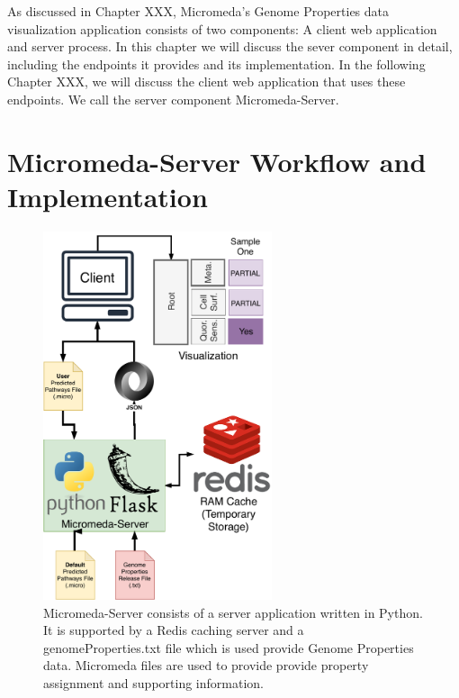 As discussed in Chapter XXX, Micromeda's Genome Properties data visualization application consists of two components: A client web application and server process. In this chapter we will discuss the sever component in detail, including the endpoints it provides and its implementation. In the following Chapter XXX, we will discuss the client web application that uses these endpoints. We call the server component Micromeda-Server.

\section{Micromeda-Server Workflow and Implementation} \label{server-workflow}

\begin{figure}[!ht]
  \centering
	\includegraphics[width=0.60\textwidth]{media/Micromeda-Server.pdf}
	 \caption{Micromeda-Server consists of a server application written in Python. It is supported by a Redis caching server and a genomeProperties.txt file which is used provide Genome Properties data. Micromeda files are used to provide provide property assignment and supporting information.}
	 \label{fig:micromeda-server}
\end{figure}

